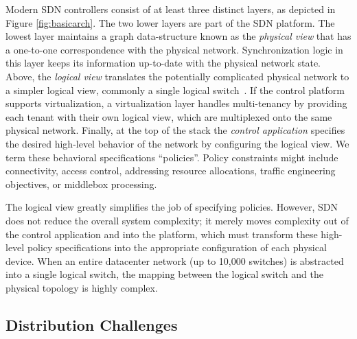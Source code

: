 {Modern SDN controllers consist of at least three distinct layers, as depicted in
Figure \ref{fig:basicarch}. The two lower layers are part of the SDN platform.
The lowest layer maintains a graph data-structure known as the \emph{physical view}
that has a one-to-one correspondence with the physical network.
Synchronization logic in this layer keeps its information up-to-date with the
physical network state. Above, the \emph{logical view} translates the
potentially complicated physical network to a simpler logical view, commonly a single
logical switch~\cite{Casado:2010:VNF:1921151.1921162}. If the control platform supports virtualization, a
virtualization layer handles multi-tenancy by providing each tenant with their
own logical view, which are multiplexed onto the same physical network.
Finally, at the top of the stack
the \emph{control application} specifies the desired
high-level behavior of the network by configuring the logical view. We term these behavioral specifications
``policies''. Policy constraints might include connectivity, access control,
addressing resource allocations, traffic engineering objectives, or middlebox
processing.

The logical view greatly simplifies the job of specifying policies. However, SDN
does not reduce the overall system complexity; it merely moves complexity out of
the control application and into the platform, which must transform these
high-level policy specifications into the appropriate configuration of each
physical device. When an entire datacenter network (up to 10,000 switches) is
abstracted into a single logical switch, the mapping between the logical switch
and the physical topology is highly complex.


\subsection{Distribution Challenges}

}
